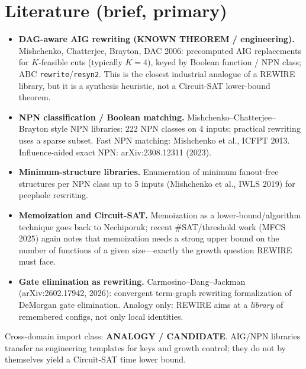\documentclass[11pt]{article}
\begin{document}
\section{Literature (brief, primary)}
\begin{itemize}
\item \textbf{DAG-aware AIG rewriting (KNOWN THEOREM / engineering).}
  Mishchenko, Chatterjee, Brayton, DAC 2006: precomputed AIG replacements for $K$-feasible cuts (typically $K{=}4$), keyed by Boolean function / NPN class; ABC \texttt{rewrite}/\texttt{resyn2}. This is the closest industrial analogue of a REWIRE library, but it is a synthesis heuristic, not a Circuit-SAT lower-bound theorem.
\item \textbf{NPN classification / Boolean matching.}
  Mishchenko--Chatterjee--Brayton style NPN libraries: 222 NPN classes on 4 inputs; practical rewriting uses a sparse subset. Fast NPN matching: Mishchenko et al., ICFPT 2013. Influence-aided exact NPN: arXiv:2308.12311 (2023).
\item \textbf{Minimum-structure libraries.}
  Enumeration of minimum fanout-free structures per NPN class up to 5 inputs (Mishchenko et al., IWLS 2019) for peephole rewriting.
\item \textbf{Memoization and Circuit-SAT.}
  Memoization as a lower-bound/algorithm technique goes back to Nechiporuk; recent \#SAT/threshold work (MFCS 2025) again notes that memoization needs a strong upper bound on the number of functions of a given size---exactly the growth question REWIRE must face.
\item \textbf{Gate elimination as rewriting.}
  Carmosino--Dang--Jackman (arXiv:2602.17942, 2026): convergent term-graph rewriting formalization of DeMorgan gate elimination. Analogy only: REWIRE aims at a \emph{library} of remembered configs, not only local identities.
\end{itemize}
Cross-domain import class: \textbf{ANALOGY / CANDIDATE}. AIG/NPN libraries transfer as engineering templates for keys and growth control; they do not by themselves yield a Circuit-SAT time lower bound.
\end{document}

